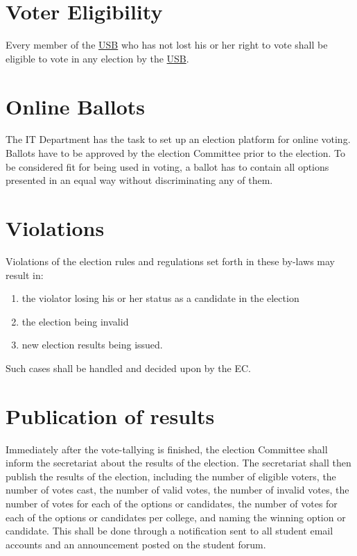 
\section{Voter Eligibility} 
Every member of the \hyperref[studentbody]{USB} who has not lost his or her right to vote shall be eligible to vote in any election by the \hyperref[studentbody]{USB}. 

\section{Online Ballots} 
The IT Department has the task to set up an election platform for online voting. Ballots have to be approved by the election Committee prior to the election. To be considered fit for being used in voting, a ballot has to contain all options presented in an equal way without discriminating any of them.

\section{Violations} 
Violations of the election rules and regulations set forth in these by-laws may result in:
\begin{enumerate}[nosep]
\item the violator losing his or her status as a candidate in the election
\item the election being invalid
\item new election results being issued.
\end{enumerate}
Such cases shall be handled and decided upon by the EC.

\section{Publication of results}
Immediately after the vote-tallying is finished, the election Committee shall inform the secretariat about the results of the election. The secretariat shall then publish the results of the election, including the number of eligible voters, the number of votes cast, the number of valid votes, the number of invalid votes, the number of votes for each of the options or candidates, the number of votes for each of the options or candidates per college, and naming the winning option or candidate. This shall be done through a notification sent to all student email accounts and an announcement posted on the student forum.

